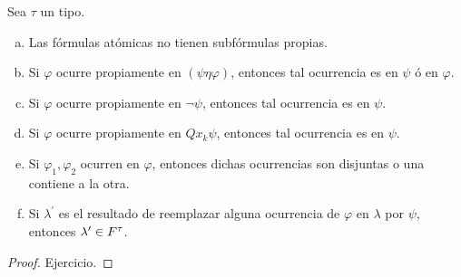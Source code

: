   \begin{lemma} \label{lemma_42}
    \PN Sea $\tau$ un tipo.
    \begin{enumerate}[(a)]
      \item Las fórmulas atómicas no tienen subfórmulas propias.
      \item Si $\varphi$ ocurre propiamente en $(\psi \eta \varphi)$, entonces tal ocurrencia es en $\psi$ ó en
        $\varphi$.
      \item Si $\varphi$ ocurre propiamente en $\lnot \psi$, entonces tal ocurrencia es en $\psi$.
      \item Si $\varphi$ ocurre propiamente en $Qx_{k} \psi$, entonces tal ocurrencia es en $\psi$.
      \item Si $\varphi_{1}, \varphi_{2}$ ocurren en $\varphi$, entonces dichas ocurrencias son disjuntas o una contiene
        a la otra.
      \item Si $\lambda^{\prime}$ es el resultado de reemplazar alguna ocurrencia de $\varphi$ en $\lambda$ por $\psi$,
        entonces $\lambda^{\prime} \in F^{\tau}$.
    \end{enumerate}
  \end{lemma}
  \begin{proof}
    Ejercicio.
  \end{proof}
